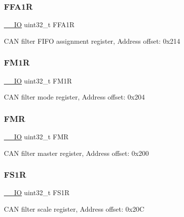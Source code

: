 \subsubsection{\texorpdfstring{F\+F\+A1R}{FFA1R}}
{\footnotesize\ttfamily \hyperlink{core__sc300_8h_aec43007d9998a0a0e01faede4133d6be}{\+\_\+\+\_\+\+IO} uint32\+\_\+t F\+F\+A1R}

C\+AN filter F\+I\+FO assignment register, Address offset\+: 0x214 \mbox{\label{struct_c_a_n___type_def_aaa6f4cf1f16aaa6d17ec6c410db76acf}} 
\subsubsection{\texorpdfstring{F\+M1R}{FM1R}}
{\footnotesize\ttfamily \hyperlink{core__sc300_8h_aec43007d9998a0a0e01faede4133d6be}{\+\_\+\+\_\+\+IO} uint32\+\_\+t F\+M1R}

C\+AN filter mode register, Address offset\+: 0x204 \mbox{\label{struct_c_a_n___type_def_a1cb734df34f6520a7204c4c70634ebba}} 
\subsubsection{\texorpdfstring{F\+MR}{FMR}}
{\footnotesize\ttfamily \hyperlink{core__sc300_8h_aec43007d9998a0a0e01faede4133d6be}{\+\_\+\+\_\+\+IO} uint32\+\_\+t F\+MR}

C\+AN filter master register, Address offset\+: 0x200 \mbox{\label{struct_c_a_n___type_def_aae0256ae42106ee7f87fc7e5bdb779d4}} 
\subsubsection{\texorpdfstring{F\+S1R}{FS1R}}
{\footnotesize\ttfamily \hyperlink{core__sc300_8h_aec43007d9998a0a0e01faede4133d6be}{\+\_\+\+\_\+\+IO} uint32\+\_\+t F\+S1R}

C\+AN filter scale register, Address offset\+: 0x20C \mbox{\label{struct_c_a_n___type_def_a6566f8cfbd1d8aa7e8db046aa35e77db}} 
